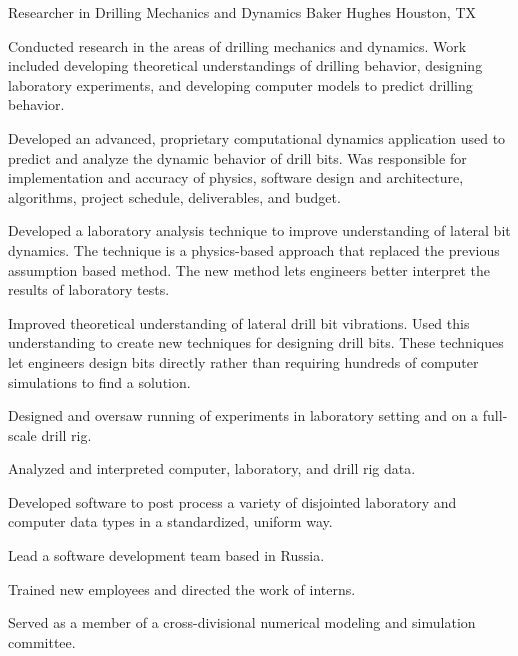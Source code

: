 \documentclass{resume}
\begin{document}
            {Researcher in Drilling Mechanics and Dynamics}
            {Baker Hughes}
			{Houston, TX}
			
					\noindent 
				Conducted research in the areas of drilling mechanics and dynamics.  Work included developing theoretical understandings of drilling behavior, designing laboratory experiments, and developing computer models to predict drilling behavior.
			
		\begin{bulletedlist}
			
		\item 
					Developed an advanced, proprietary computational dynamics application used to predict and analyze the dynamic behavior of drill bits.  Was responsible for implementation and accuracy of physics, software design and architecture, algorithms, project schedule, deliverables, and budget.
				
		\item Developed a laboratory analysis technique to improve understanding of lateral bit dynamics.  The technique is a physics-based approach that replaced the previous assumption based method.  The new method lets engineers better interpret the results of laboratory tests.
		\item Improved theoretical understanding of lateral drill bit vibrations.  Used this understanding to create new techniques for designing drill bits.  These techniques let engineers design bits directly rather than requiring hundreds of computer simulations to find a solution.
		\item Designed and oversaw running of experiments in laboratory setting and on a full-scale drill rig.
		\item Analyzed and interpreted computer, laboratory, and drill rig data.
		\item Developed software to post process a variety of disjointed laboratory and computer data types in a standardized, uniform way.
		\item Lead a software development team based in Russia.
		\item Trained new employees and directed the work of interns.
		\item Served as a member of a cross-divisional numerical modeling and simulation committee.
		\end{bulletedlist}
			\vspace*{-12pt}
	\hspace*{0pt}\\ \vspace*{-2pt}
				
\end{document}
